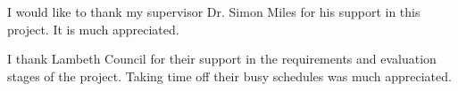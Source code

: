 I would like to thank my supervisor Dr. Simon Miles for his support in this project. It is much appreciated. \par
I thank Lambeth Council for their support in the requirements and evaluation stages of the project. Taking time off their busy schedules was much appreciated.

